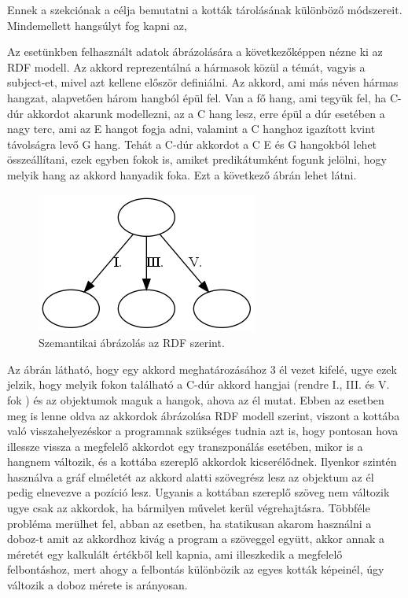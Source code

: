 
Ennek a szekciónak a célja bemutatni a kották tárolásának különböző módszereit. Mindemellett hangsúlyt fog kapni az, 

Az esetünkben felhasznált adatok ábrázolására a következőképpen nézne ki az RDF modell. Az akkord reprezentálná a hármasok közül a témát, vagyis a subject-et, mivel azt kellene először definiálni. Az akkord, ami más néven hármas hangzat, alapvetően három hangból épül fel. Van a fő hang, ami tegyük fel, ha C-dúr akkordot akarunk modellezni, az a C hang lesz, erre épül a dúr esetében a nagy terc, ami az E hangot fogja adni, valamint a C hanghoz igazított kvint távolságra levő G hang. Tehát a C-dúr akkordot a C E és G hangokból lehet összeállítani, ezek egyben fokok is, amiket predikátumként fogunk jelölni, hogy melyik hang az akkord hanyadik foka. Ezt a következő ábrán lehet látni.
\par
\begin{figure}[h]
	\includegraphics[scale=1]{images/rdf_graph.png}
	\caption{Szemantikai ábrázolás az RDF szerint.}
	\label{fig:graph1}
\end{figure}
\newpage
Az ábrán látható, hogy egy akkord meghatározásához 3 él vezet kifelé, ugye ezek jelzik, hogy melyik fokon található a C-dúr akkord hangjai (rendre I., III. és V. fok ) és az objektumok maguk a hangok, ahova az él mutat. Ebben az esetben meg is lenne oldva az akkordok ábrázolása RDF modell szerint, viszont a kottába való visszahelyezéskor a programnak szükséges tudnia azt is, hogy pontosan hova illessze vissza a megfelelő akkordot egy transzponálás esetében, mikor is a hangnem változik, és a kottába szereplő akkordok kicserélődnek. 
Ilyenkor szintén használva a gráf elméletét az akkord alatti szövegrész lesz az objektum az él pedig elnevezve a pozíció lesz. Ugyanis a kottában szereplő szöveg nem változik ugye csak az akkordok, ha bármilyen művelet kerül végrehajtásra. Többféle probléma merülhet fel, abban az esetben, ha statikusan akarom használni a doboz-t amit az akkordhoz kivág a program a szöveggel együtt, akkor annak a méretét egy kalkulált értékből kell kapnia, ami illeszkedik a megfelelő felbontáshoz, mert ahogy a felbontás különbözik az egyes kották képeinél, úgy változik a doboz mérete is arányosan.

